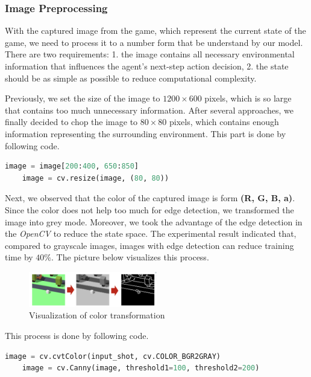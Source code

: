 \documentclass{article}
\begin{document}
\subsubsection{Image Preprocessing}
With the captured image from the game, which represent the current state of the game,  we need to process it to a number form that be understand by our model. There are two requirements: 1. the image contains all necessary environmental information that influences the agent's next-step action decision, 2. the state should be as simple as possible to reduce computational complexity. 

Previously, we set the size of the image to $1200 \times 600$ pixels, which is so large that contains too much unnecessary information. After several approaches, we finally decided to chop the image to $80 \times 80$ pixels, which contains enough information representing the surrounding environment. This part is done by following code. 

\begin{lstlisting}[language=Python]
    image = image[200:400, 650:850]
    image = cv.resize(image, (80, 80))
\end{lstlisting}

Next, we observed that the color of the captured image is form \textbf{(R, G, B, a)}. Since the color does not help too much for edge detection, we transformed the image into grey mode. Moreover, we took the advantage of the edge detection in the \textit{OpenCV} to reduce the state space. The experimental result indicated that, compared to grayscale images, images with edge detection can reduce training time by $40\%$. The picture below visualizes this process. 

\begin{figure}[h]
\caption{Visualization of color transformation}
\centering
\includegraphics[width=0.5\textwidth]{color_transform_visualization.png}
\end{figure}

This process is done by following code.
\begin{lstlisting}[language=Python]
    image = cv.cvtColor(input_shot, cv.COLOR_BGR2GRAY)
    image = cv.Canny(image, threshold1=100, threshold2=200)
\end{lstlisting}
\end{document}
